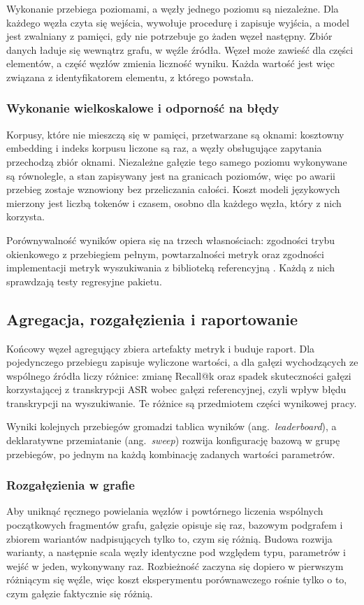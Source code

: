 Wykonanie przebiega poziomami, a węzły jednego poziomu są niezależne. Dla każdego węzła czyta się
wejścia, wywołuje procedurę i zapisuje wyjścia, a model jest zwalniany z pamięci, gdy nie
potrzebuje go żaden węzeł następny. Zbiór danych ładuje się wewnątrz grafu, w węźle źródła.
Węzeł może zawieść dla części elementów, a część węzłów zmienia liczność wyniku. Każda wartość
jest więc związana z identyfikatorem elementu, z którego powstała.

\subsubsection{Wykonanie wielkoskalowe i odporność na błędy}
Korpusy, które nie mieszczą się w pamięci, przetwarzane są oknami: kosztowny embedding i indeks
korpusu liczone są raz, a węzły obsługujące zapytania przechodzą zbiór oknami. Niezależne gałęzie
tego samego poziomu wykonywane są równolegle, a stan zapisywany jest na granicach poziomów, więc
po awarii przebieg zostaje wznowiony bez przeliczania całości. Koszt modeli językowych mierzony
jest liczbą tokenów i czasem, osobno dla każdego węzła, który z nich korzysta.

Porównywalność wyników opiera się na trzech własnościach: zgodności trybu okienkowego z przebiegiem
pełnym, powtarzalności metryk oraz zgodności implementacji metryk wyszukiwania z biblioteką
referencyjną \cite{vangysel2018pytrec}. Każdą z nich sprawdzają testy regresyjne pakietu.

\subsection{Agregacja, rozgałęzienia i raportowanie}
Końcowy węzeł agregujący zbiera artefakty metryk i buduje raport. Dla pojedynczego przebiegu
zapisuje wyliczone wartości, a dla gałęzi wychodzących ze wspólnego źródła liczy różnice: zmianę
Recall@k oraz spadek skuteczności gałęzi korzystającej z transkrypcji ASR wobec gałęzi
referencyjnej, czyli wpływ błędu transkrypcji na wyszukiwanie. Te różnice są przedmiotem części
wynikowej pracy.

Wyniki kolejnych przebiegów gromadzi tablica wyników (ang.\ \textit{leaderboard}), a deklaratywne
przemiatanie (ang.\ \textit{sweep}) rozwija konfigurację bazową w grupę przebiegów, po jednym na
każdą kombinację zadanych wartości parametrów.

\subsubsection{Rozgałęzienia w grafie}
Aby uniknąć ręcznego powielania węzłów i powtórnego liczenia wspólnych początkowych fragmentów
grafu, gałęzie opisuje się raz, bazowym podgrafem i zbiorem wariantów nadpisujących tylko to, czym
się różnią. Budowa rozwija warianty, a następnie scala węzły identyczne pod względem typu,
parametrów i wejść w jeden, wykonywany raz. Rozbieżność zaczyna się dopiero w pierwszym różniącym
się węźle, więc koszt eksperymentu porównawczego rośnie tylko o to, czym gałęzie faktycznie się
różnią.

